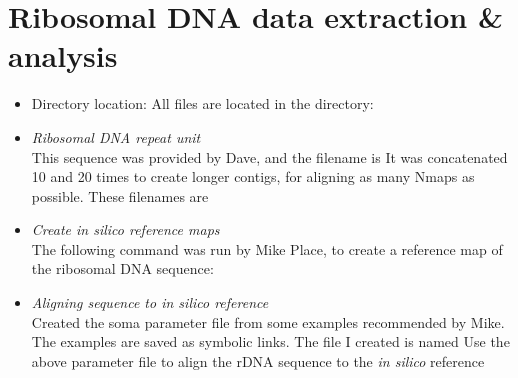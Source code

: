 \documentclass[11pt]{article}
\begin{document}
\section{Ribosomal DNA data extraction \& analysis}
\begin{itemize}
\item Directory location: All files are located in the directory:

\item \emph{Ribosomal DNA repeat unit} \\
This sequence was provided by Dave, and the filename is 
It was concatenated 10 and 20 times to create longer contigs, for aligning as many Nmaps as possible. These filenames are 

\item \emph{Create in silico reference maps} \\
The following command was run by Mike Place, to create a reference map of the ribosomal DNA sequence:

\item \emph{Aligning sequence to in silico reference} \\
Created the soma parameter file from some examples recommended by Mike. The examples are saved as symbolic links. The file I created is named 
Use the above parameter file to align the rDNA sequence to the {\emph{in silico}} reference


\end{itemize}
\end{document}
